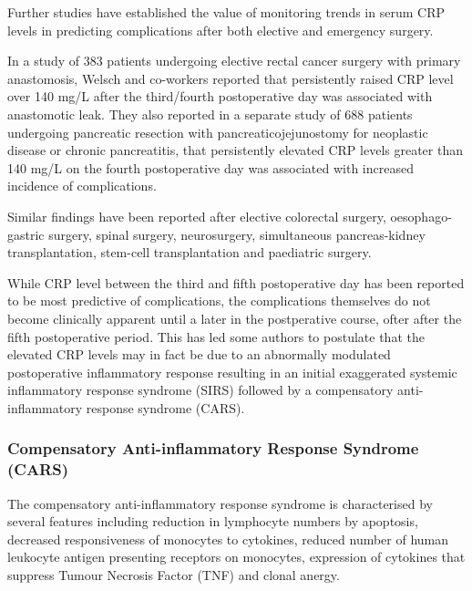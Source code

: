 Further studies have established the value of monitoring trends in serum CRP levels in predicting complications after both elective and emergency surgery.\parencite{mustard_c-reactive_1987}

In a study of 383 patients undergoing elective rectal cancer surgery with primary anastomosis, Welsch and co-workers reported that persistently raised CRP level over 140 mg/L after the third/fourth postoperative day was associated with anastomotic leak.\parencite{welsch_c-reactive_2007} They also reported in a separate study of 688 patients undergoing pancreatic resection with pancreaticojejunostomy for neoplastic disease or chronic pancreatitis, that persistently elevated CRP levels greater than 140 mg/L on the fourth postoperative day was associated with increased incidence of complications. 

Similar findings have been reported after elective colorectal surgery\parencite{ortega-deballon_c-reactive_2010, woeste_increased_2010}, oesophago-gastric surgery\parencite{dutta_persistent_2011}, spinal surgery\parencite{meyer_c-reactive_1995,mok_use_2008}, neurosurgery\parencite{al-jabi_value_2010}, simultaneous pancreas-kidney transplantation\parencite{wullstein_high_2004}, stem-cell transplantation\parencite{mcneer_early_2010} and paediatric surgery\parencite{laporta_baez_c-reactive_2011}.

While CRP level between the third and fifth postoperative day has been reported to be most predictive of complications,  the complications themselves do not become clinically apparent until a later in the postperative course, ofter after the fifth postoperative period. This has led some authors to postulate that the elevated CRP levels may in fact be due to an abnormally modulated postoperative inflammatory response resulting in an initial exaggerated systemic inflammatory response syndrome (SIRS) followed by a compensatory anti-inflammatory response syndrome (CARS). 

\subsubsection{Compensatory Anti-inflammatory Response Syndrome (CARS)}
The compensatory anti-inflammatory response syndrome is characterised by several features including reduction in lymphocyte numbers by apoptosis, decreased responsiveness of monocytes to cytokines, reduced number of human leukocyte antigen presenting receptors on monocytes, expression of cytokines that suppress Tumour Necrosis Factor (TNF) and clonal anergy.

